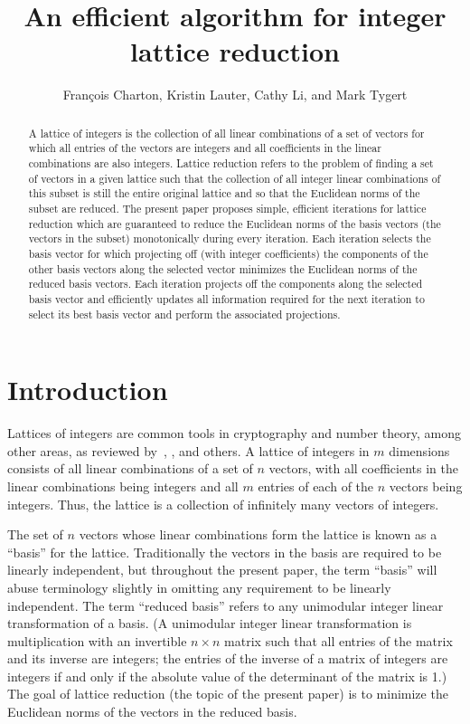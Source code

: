 \documentclass{article}
\title{An efficient algorithm for integer lattice reduction}
\author{Fran\c{c}ois Charton, Kristin Lauter, Cathy Li, and Mark Tygert}
\begin{document}
\maketitle



\begin{abstract}
A lattice of integers is the collection of all linear combinations
of a set of vectors for which all entries of the vectors are integers
and all coefficients in the linear combinations are also integers.
Lattice reduction refers to the problem of finding a set of vectors
in a given lattice such that the collection of all integer linear combinations
of this subset is still the entire original lattice and so that
the Euclidean norms of the subset are reduced.
The present paper proposes simple, efficient iterations for lattice reduction
which are guaranteed to reduce the Euclidean norms of the basis vectors
(the vectors in the subset) monotonically during every iteration.
Each iteration selects the basis vector for which projecting off
(with integer coefficients) the components of the other basis vectors
along the selected vector minimizes the Euclidean norms
of the reduced basis vectors.
Each iteration projects off the components along the selected basis vector
and efficiently updates all information required for the next iteration
to select its best basis vector and perform the associated projections.
\end{abstract}



\section{Introduction}
\label{intro}

Lattices of integers are common tools in cryptography and number theory,
among other areas, as reviewed by~\cite{cassels}, \cite{peikart}, and others.
A lattice of integers in $m$ dimensions consists
of all linear combinations of a set of $n$ vectors,
with all coefficients in the linear combinations being integers
and all $m$ entries of each of the $n$ vectors being integers.
Thus, the lattice is a collection of infinitely many vectors of integers.

The set of $n$ vectors whose linear combinations form the lattice
is known as a ``basis'' for the lattice.
Traditionally the vectors in the basis are required to be linearly independent,
but throughout the present paper, the term ``basis'' will abuse terminology
slightly in omitting any requirement to be linearly independent.
The term ``reduced basis'' refers
to any unimodular integer linear transformation of a basis.
(A unimodular integer linear transformation is multiplication
with an invertible $n \times n$ matrix such that all entries of the matrix
and its inverse are integers; the entries of the inverse of a matrix
of integers are integers if and only if the absolute value
of the determinant of the matrix is 1.)
The goal of lattice reduction (the topic of the present paper)
is to minimize the Euclidean norms of the vectors in the reduced basis.
\end{document}
